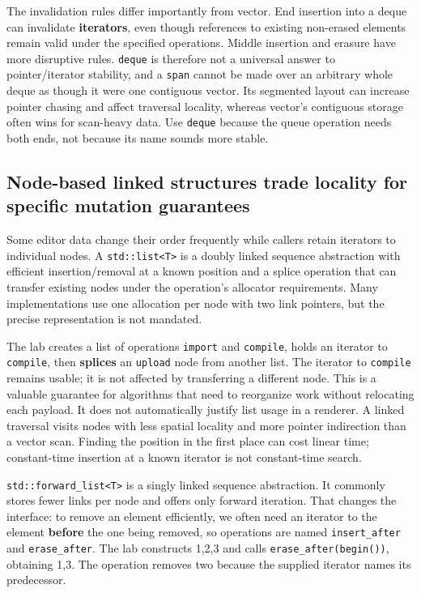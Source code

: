The invalidation rules differ importantly from vector. End insertion into a deque can invalidate \textbf{iterators}, even though references to existing non-erased elements remain valid under the specified operations. Middle insertion and erasure have more disruptive rules. \texttt{deque} is therefore not a universal answer to pointer/iterator stability, and a \texttt{span} cannot be made over an arbitrary whole deque as though it were one contiguous vector. Its segmented layout can increase pointer chasing and affect traversal locality, whereas vector's contiguous storage often wins for scan-heavy data. Use \texttt{deque} because the queue operation needs both ends, not because its name sounds more stable.

\subsection{Node-based linked structures trade locality for specific mutation guarantees}\label{05-engine-i-ch005-node-based-linked-structures-trade-locality-for-specific-mutation-guarantees}

Some editor data change their order frequently while callers retain iterators to individual nodes. A \texttt{std::list\textless{}T\textgreater{}} is a doubly linked sequence abstraction with efficient insertion/removal at a known position and a splice operation that can transfer existing nodes under the operation's allocator requirements. Many implementations use one allocation per node with two link pointers, but the precise representation is not mandated.

The lab creates a list of operations \texttt{import} and \texttt{compile}, holds an iterator to \texttt{compile}, then \textbf{splices} an \texttt{upload} node from another list. The iterator to \texttt{compile} remains usable; it is not affected by transferring a different node. This is a valuable guarantee for algorithms that need to reorganize work without relocating each payload. It does not automatically justify list usage in a renderer. A linked traversal visits nodes with less spatial locality and more pointer indirection than a vector scan. Finding the position in the first place can cost linear time; constant-time insertion at a known iterator is not constant-time search.

\texttt{std::forward\_list\textless{}T\textgreater{}} is a singly linked sequence abstraction. It commonly stores fewer links per node and offers only forward iteration. That changes the interface: to remove an element efficiently, we often need an iterator to the element \textbf{before} the one being removed, so operations are named \texttt{insert\_after} and \texttt{erase\_after}. The lab constructs 1,2,3 and calls \texttt{erase\_after(begin())}, obtaining 1,3. The operation removes two because the supplied iterator names its predecessor.

